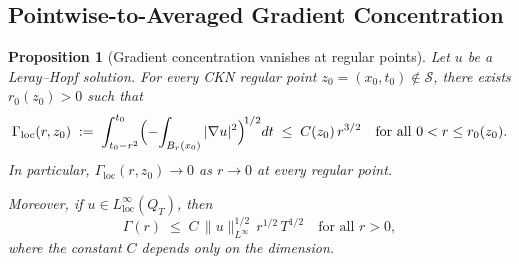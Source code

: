 \documentclass[11pt]{article}
\newtheorem{proposition}[theorem]{Proposition}
\theoremstyle{definition}
\theoremstyle{remark}
\newcommand{\grad}{\nabla}
\newcommand{\Xint}{\mathop{\mathchoice{\vcenter{\hbox{$\displaystyle-$}}}%
  {\vcenter{\hbox{$\textstyle-$}}}%
  {\vcenter{\hbox{$\scriptstyle-$}}}%
  {\vcenter{\hbox{$\scriptscriptstyle-$}}}}\!\int}
\begin{document}
\subsection{Pointwise-to-Averaged Gradient Concentration}
\label{subsec:ckn-averaged}

\begin{proposition}[Gradient concentration vanishes at regular points]
\label{prop:gamma-vanishes-regular}
Let $u$ be a Leray--Hopf solution.  For every CKN regular point
$z_0 = (x_0,t_0) \notin \mathcal{S}$, there exists $r_0(z_0) > 0$ such that
\begin{equation}\label{eq:gamma-regular-decay}
  \Gamma_{\mathrm{loc}}(r, z_0)
  \;:=\; \int_{t_0 - r^2}^{t_0}
    \Bigl(\Xint_{B_r(x_0)} |\grad u|^2\Bigr)^{\!1/2} dt
  \;\leq\; C(z_0)\, r^{3/2}
  \quad \text{for all } 0 < r \leq r_0(z_0).
\end{equation}
In particular, $\Gamma_{\mathrm{loc}}(r, z_0) \to 0$ as $r \to 0$ at
every regular point.

Moreover, if $u \in L^\infty_{\mathrm{loc}}(Q_T)$, then
\begin{equation}\label{eq:gamma-linfty}
  \Gamma(r) \;\leq\; C\,\|u\|_{L^\infty}^{1/2}\,r^{1/2}\,T^{1/2}
  \quad \text{for all } r > 0,
\end{equation}
where the constant $C$ depends only on the dimension.
\end{proposition}
\end{document}
